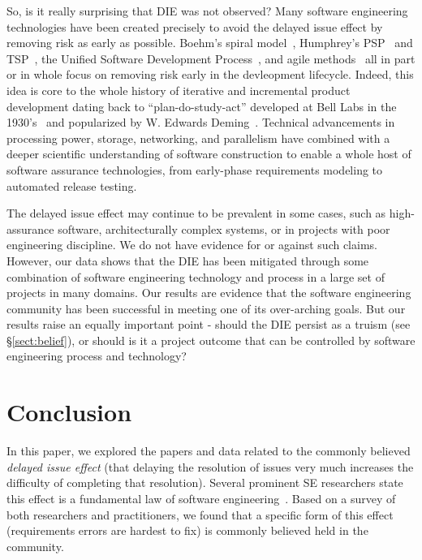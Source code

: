 \documentclass[smallcondensed]{svjour3}
\begin{document}
So, is it really surprising that DIE was not observed? Many software engineering technologies have been created precisely to avoid the delayed issue effect by removing risk as early as possible. Boehm's spiral model~\cite{boehm1988spiral}, Humphrey's PSP~\cite{humphrey1995discipline} and TSP~\cite{tsp00}, the Unified Software Development Process~\cite{jacobson1999unified}, and agile methods~\cite{Beck2001a} all in part or in whole focus on removing risk early in the devleopment lifecycle. Indeed, this idea is core to the whole history of iterative and incremental product development dating back to ``plan-do-study-act'' developed at Bell Labs in the 1930's~\cite{larman2003iterative} and popularized by W. Edwards Deming~\cite{deming1986out}. Technical advancements in processing power, storage, networking, and parallelism have combined with a deeper scientific understanding of software construction to enable a whole host of software assurance technologies, from early-phase requirements modeling to automated release testing.

The delayed issue effect may continue to be prevalent in some cases, such as high-assurance software, architecturally complex systems, or in projects with poor engineering discipline. We do not have evidence for or against such claims. However, our data shows that the DIE has been mitigated through some combination of software engineering technology and process in a large set of projects in many domains. Our results are evidence that the software engineering community has been successful in meeting one of its over-arching goals. But our results raise an equally important point - should the DIE persist as a truism (see \S\ref{sect:belief}), or should is it a project outcome that can be controlled by software engineering process and technology?
 
 
 \section{Conclusion}
  
 
In this paper, we explored   the papers and data related to the 
commonly believed {\em delayed issue effect} (that delaying the resolution of issues
very much 
increases the difficulty of completing that  resolution).
Several prominent SE researchers state this effect is a fundamental law of software engineering~\cite{boehm01,mcconnell01,boehm01,glass02}.
Based on a  survey  of both researchers and practitioners, we  found that
a specific form  of this effect (requirements errors are hardest to fix) is  commonly believed
held in the community.  
\end{document}
